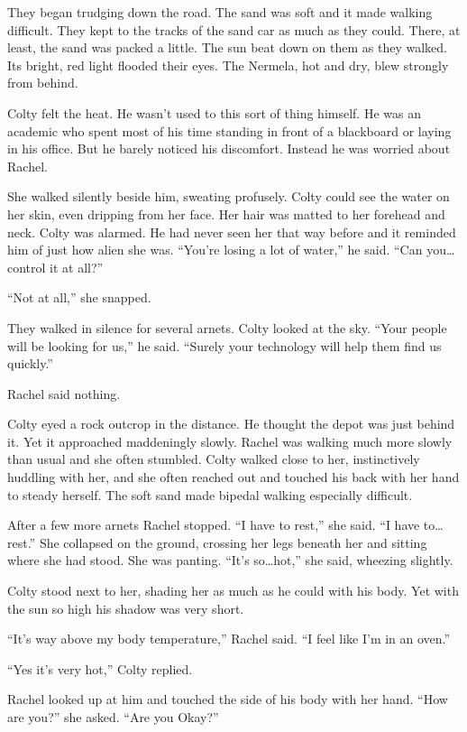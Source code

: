 They began trudging down the road. The sand was soft and it made walking difficult. They kept to
the tracks of the sand car as much as they could. There, at least, the sand was packed a little.
The sun beat down on them as they walked. Its bright, red light flooded their eyes. The Nermela,
hot and dry, blew strongly from behind.

Colty felt the heat. He wasn't used to this sort of thing himself. He was an academic who spent
most of his time standing in front of a blackboard or laying in his office. But he barely
noticed his discomfort. Instead he was worried about Rachel.

She walked silently beside him, sweating profusely. Colty could see the water on her skin, even
dripping from her face. Her hair was matted to her forehead and neck. Colty was alarmed. He had
never seen her that way before and it reminded him of just how alien she was. ``You're losing a
lot of water,'' he said. ``Can you\ldots control it at all?''

``Not at all,'' she snapped.

They walked in silence for several arnets. Colty looked at the sky. ``Your people will be
looking for us,'' he said. ``Surely your technology will help them find us quickly.''

Rachel said nothing.

Colty eyed a rock outcrop in the distance. He thought the depot was just behind it. Yet it
approached maddeningly slowly. Rachel was walking much more slowly than usual and she often
stumbled. Colty walked close to her, instinctively huddling with her, and she often reached out
and touched his back with her hand to steady herself. The soft sand made bipedal walking
especially difficult.

After a few more arnets Rachel stopped. ``I have to rest,'' she said. ``I have to\ldots rest.''
She collapsed on the ground, crossing her legs beneath her and sitting where she had stood. She
was panting. ``It's so\ldots hot,'' she said, wheezing slightly.

Colty stood next to her, shading her as much as he could with his body. Yet with the sun so high
his shadow was very short.

``It's way above my body temperature,'' Rachel said. ``I feel like I'm in an oven.''

``Yes it's very hot,'' Colty replied.

Rachel looked up at him and touched the side of his body with her hand. ``How are you?'' she
asked. ``Are you Okay?''

